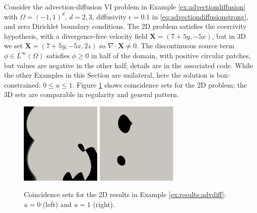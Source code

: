 \documentclass[review,hidelinks,onefignum,onetabnum]{siamart220329}
\newcommand{\eps}{\epsilon}
\newcommand{\grad}{\nabla}
\newcommand{\bX}{\mathbf{X}}
\begin{document}
\begin{example}  \label{ex:results:advdiff}
Consider the advection-diffusion VI problem in Example \ref{ex:advectiondiffusion} with $\Omega=(-1,1)^d$, $d=2,3$, diffusivity $\eps=0.1$ in \eqref{eq:advectiondiffusionstrong}, and zero Dirichlet boundary conditions.  The 2D problem satisfies the coercivity hypothesis, with a divergence-free velocity field $\bX = (7+5y,-5x)$, but in 3D we set $\bX = (7+5y,-5x,2z)$ so $\grad\cdot\bX \ne 0$.  The discontinuous source term $\phi \in L^\infty(\Omega)$ satisfies $\phi\ge 0$ in half of the domain, with positive circular patches, but values are negative in the other half; details are in the associated code.  While the other Examples in this Section are unilateral, here the solution is box-constrained: $0 \le u \le 1$.  Figure \ref{fig:results:advdiff} shows coincidence sets for the 2D problem; the 3D sets are comparable in regularity and general pattern.

\begin{figure}[ht]
\centering
\includegraphics[width=0.35\textwidth]{fixfigs/poll2d-zero-set.png} \qquad \includegraphics[width=0.35\textwidth]{fixfigs/poll2d-one-set.png}
\caption{Coincidence sets for the 2D results in Example \ref{ex:results:advdiff}: $u=0$ (left) and $u=1$ (right).}
\label{fig:results:advdiff}
\end{figure}


\end{example}
\end{document}
